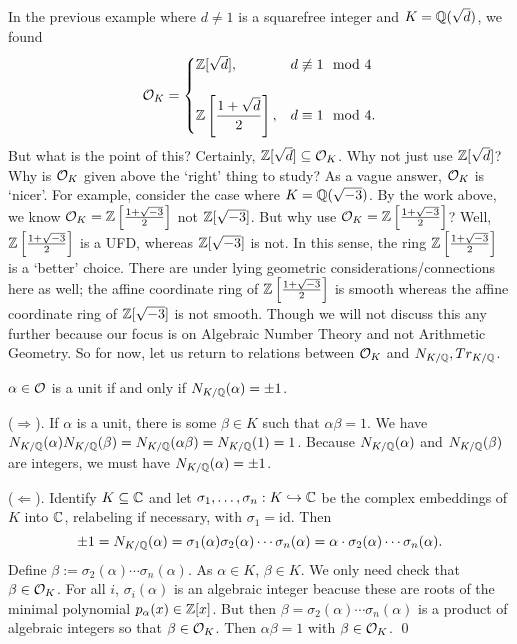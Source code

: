 In the previous example where $d \neq 1$ is a squarefree integer and $K=\mathbb{Q}(\sqrt{d})$, we found
	\[
	\mathcal{O}_K=
	\begin{cases}
	\mathbb{Z}[\sqrt{d}], & d \not\equiv 1 \mod 4 \\ \\
	\mathbb{Z}\left[ \dfrac{1+\sqrt{d}}{2} \right], & d \equiv 1 \mod 4. 
	\end{cases} 
	\] 
But what is the point of this? Certainly, $\mathbb{Z}[\sqrt{d}] \subseteq \mathcal{O}_K$. Why not just use $\mathbb{Z}[\sqrt{d}]$? Why is $\mathcal{O}_K$ given above the `right' thing to study? As a vague answer, $\mathcal{O}_K$ is `nicer'. For example, consider the case where $K= \mathbb{Q}(\sqrt{-3})$. By the work above, we know $\mathcal{O}_K= \mathbb{Z}\left[ \frac{1 + \sqrt{-3}}{2} \right]$ not $\mathbb{Z}[\sqrt{-3}]$. But why use $\mathcal{O}_K= \mathbb{Z}\left[ \frac{1 + \sqrt{-3}}{2} \right]$? Well, $\mathbb{Z}\left[ \frac{1 + \sqrt{-3}}{2} \right]$ is a UFD, whereas $\mathbb{Z}[\sqrt{-3}]$ is not. In this sense, the ring $\mathbb{Z}\left[\frac{1+\sqrt{-3}}{2}\right]$ is a `better' choice. There are under lying geometric considerations/connections here as well; the affine coordinate ring of $\mathbb{Z}\left[ \frac{1 + \sqrt{-3}}{2} \right]$ is smooth whereas the affine coordinate ring of $\mathbb{Z}[\sqrt{-3}]$ is not smooth. Though we will not discuss this any further because our focus is on Algebraic Number Theory and not Arithmetic Geometry. So for now, let us return to relations between $\mathcal{O}_K$ and $N_{K/\mathbb{Q}}, Tr_{K/\mathbb{Q}}$. 


\begin{prop}
$\alpha \in \mathcal{O}$ is a unit if and only if $N_{K/\mathbb{Q}}(\alpha)= \pm 1$.
\end{prop}

\pf ($\Longrightarrow$). If $\alpha$ is a unit, there is some $\beta \in K$ such that $\alpha \beta= 1$. We have $N_{K/\mathbb{Q}}(\alpha) N_{K/\mathbb{Q}}(\beta)= N_{K/\mathbb{Q}}(\alpha \beta)= N_{K/\mathbb{Q}}(1)= 1$. Because $N_{K/\mathbb{Q}}(\alpha)$ and $N_{K/\mathbb{Q}}(\beta)$ are integers, we must have $N_{K/\mathbb{Q}}(\alpha)= \pm 1$. 

($\Longleftarrow$). Identify $K \subseteq \mathbb{C}$ and let $\sigma_1, \ldots, \sigma_n: K \hookrightarrow \mathbb{C}$ be the complex embeddings of $K$ into $\mathbb{C}$, relabeling if necessary, with $\sigma_1= \text{id}$. Then
	\[
	\pm 1= N_{K/\mathbb{Q}}(\alpha)= \sigma_1(\alpha) \sigma_2(\alpha) \cdots \sigma_n(\alpha)= \alpha \cdot \sigma_2(\alpha) \cdots \sigma_n(\alpha).
	\]
Define $\beta:= \sigma_2(\alpha) \cdots \sigma_n(\alpha)$. As $\alpha \in K$, $\beta \in K$. We only need check that $\beta \in \mathcal{O}_K$. For all $i$, $\sigma_i(\alpha)$ is an algebraic integer beacuse these are roots of the minimal polynomial $p_\alpha(x) \in \mathbb{Z}[x]$. But then $\beta= \sigma_2(\alpha) \cdots \sigma_n(\alpha)$ is a product of algebraic integers so that $\beta \in \mathcal{O}_K$. Then $\alpha \beta= 1$ with $\beta \in \mathcal{O}_K$. \qed \pskip



